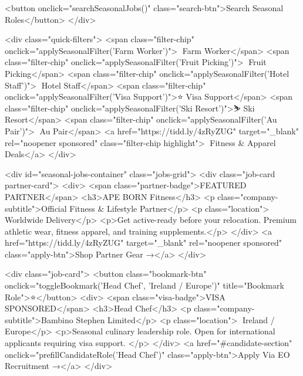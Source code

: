                 <button onclick="searchSeasonalJobs()" class="search-btn">Search Seasonal Roles</button>
            </div>

            <div class="quick-filters">
                <span class="filter-chip" onclick="applySeasonalFilter('Farm Worker')">🌾 Farm Worker</span>
                <span class="filter-chip" onclick="applySeasonalFilter('Fruit Picking')">🍓 Fruit Picking</span>
                <span class="filter-chip" onclick="applySeasonalFilter('Hotel Staff')">🏨 Hotel Staff</span>
                <span class="filter-chip" onclick="applySeasonalFilter('Visa Support')">⭐ Visa Support</span>
                <span class="filter-chip" onclick="applySeasonalFilter('Ski Resort')">⛷️ Ski Resort</span>
                <span class="filter-chip" onclick="applySeasonalFilter('Au Pair')">👶 Au Pair</span>
                <a href="https://tidd.ly/4zRyZUG" target="_blank" rel="noopener sponsored"
                    class="filter-chip highlight">💪 Fitness & Apparel Deals</a>
            </div>

            <div id="seasonal-jobs-container" class="jobs-grid">
                <div class="job-card partner-card">
                    <div>
                        <span class="partner-badge">FEATURED PARTNER</span>
                        <h3>APE BORN Fitness</h3>
                        <p class="company-subtitle">Official Fitness & Lifestyle Partner</p>
                        <p class="location">📍 Worldwide Delivery</p>
                        <p>Get active-ready before your relocation. Premium athletic wear, fitness apparel, and training
                            supplements.</p>
                    </div>
                    <a href="https://tidd.ly/4zRyZUG" target="_blank" rel="noopener sponsored" class="apply-btn">Shop
                        Partner Gear →</a>
                </div>

                <div class="job-card">
                    <button class="bookmark-btn" onclick="toggleBookmark('Head Chef', 'Ireland / Europe')"
                        title="Bookmark Role">⭐</button>
                    <div>
                        <span class="visa-badge">VISA SPONSORED</span>
                        <h3>Head Chef</h3>
                        <p class="company-subtitle">Bambino Stephen Limited</p>
                        <p class="location">📍 Ireland / Europe</p>
                        <p>Seasonal culinary leadership role. Open for international applicants requiring visa support.
                        </p>
                    </div>
                    <a href="#candidate-section" onclick="prefillCandidateRole('Head Chef')" class="apply-btn">Apply Via
                        EO Recruitment →</a>
                </div>

